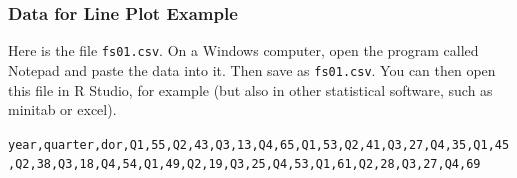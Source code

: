 \documentclass[xcolor=dvipsnames]{beamer}
\begin{document}
\begin{frame}
  \frametitle{Data for Line Plot Example}
Here is the file \texttt{fs01.csv}. On a Windows computer, open the
program called Notepad and paste the data into it. Then save as
\texttt{fs01.csv}. You can then open this file in R Studio, for
example (but also in other statistical software, such as minitab or
excel). 
\begin{alltt}
\tiny
year,quarter,dor,Q1,55,Q2,43,Q3,13,Q4,65,Q1,53,Q2,41,Q3,27,Q4,35,Q1,45,Q2,38,Q3,18,Q4,54,Q1,49,Q2,19,Q3,25,Q4,53,Q1,61,Q2,28,Q3,27,Q4,69
\end{alltt}
\end{frame}

\end{document}
